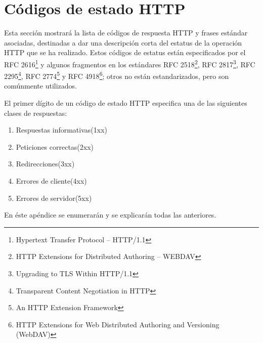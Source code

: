
\chapter{Códigos de estado HTTP}\label{appHttp}
Esta sección mostrará la lista de códigos de respuesta HTTP y frases estándar asociadas, destinadas a dar una descripción corta del estatus de la operación HTTP que se ha realizado. Estos códigos de estatus están especificados por el RFC 2616\footnote[1]{Hypertext Transfer Protocol -- HTTP/1.1} y algunos fragmentos en los estándares RFC 2518\footnote[2]{HTTP Extensions for Distributed Authoring -- WEBDAV}, RFC 2817\footnote[3]{Upgrading to TLS Within HTTP/1.1}, RFC 2295\footnote[4]{Transparent Content Negotiation in HTTP}, RFC 2774\footnote[5]{An HTTP Extension Framework} y RFC 4918\footnote[6]{HTTP Extensions for Web Distributed Authoring and Versioning (WebDAV)}; otros no están estandarizados, pero son comúnmente utilizados.
\bigskip
\par
El primer dígito de un código de estado HTTP especifica una de las siguientes clases de respuestas:
\begin{enumerate}
\item Respuestas informativas(1xx)
\item Peticiones correctas(2xx)
\item Redirecciones(3xx)
\item Errores de cliente(4xx)
\item Errores de servidor(5xx)
\end{enumerate}
\bigskip
\par
En éste apéndice se enumerarán y se explicarán todas las anteriores.

